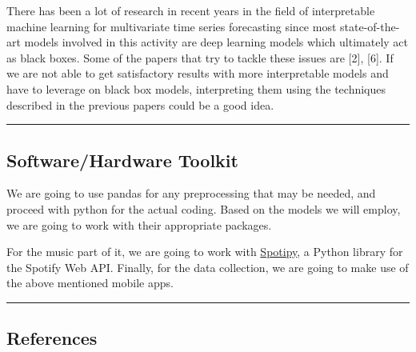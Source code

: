 \documentclass[
  12pt,
]{article}
\begin{document}
There has been a lot of research in recent years in the field of
interpretable machine learning for multivariate time series forecasting
since most state-of-the-art models involved in this activity are deep
learning models which ultimately act as black boxes. Some of the papers
that try to tackle these issues are {[}2{]}, {[}6{]}. If we are not able
to get satisfactory results with more interpretable models and have to
leverage on black box models, interpreting them using the techniques
described in the previous papers could be a good idea.

\begin{center}\rule{0.5\linewidth}{0.5pt}\end{center}

\hypertarget{softwarehardware-toolkit}{%
\subsection{Software/Hardware Toolkit}\label{softwarehardware-toolkit}}

We are going to use pandas for any preprocessing that may be needed, and
proceed with python for the actual coding. Based on the models we will
employ, we are going to work with their appropriate packages.

For the music part of it, we are going to work with
\href{https://spotipy.readthedocs.io/en/2.17.1/}{Spotipy}, a Python
library for the Spotify Web API. Finally, for the data collection, we
are going to make use of the above mentioned mobile apps.

\begin{center}\rule{0.5\linewidth}{0.5pt}\end{center}

\hypertarget{references}{%
\subsection{References}\label{references}}
\end{document}
